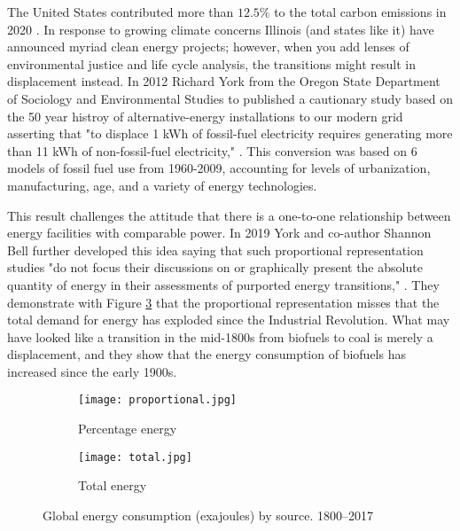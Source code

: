 The United States contributed more than $12.5\%$ to the total carbon emissions in 2020 \cite{european_commission_joint_research_centre_ghg_2021}. In response to growing climate concerns Illinois (and states like it) have announced myriad clean energy projects; however, when you add lenses of environmental justice and life cycle analysis, the transitions might result in displacement instead. In 2012 Richard York from the Oregon State Department of Sociology and Environmental Studies to published a cautionary study based on the 50 year histroy of alternative-energy installations to our modern grid asserting that "to displace 1 kWh of fossil-fuel electricity requires generating more than 11 kWh of non-fossil-fuel electricity," \cite{york_alternative_2012}. This conversion was based on 6 models of fossil fuel use from 1960-2009, accounting for levels of urbanization, manufacturing, age, and a variety of energy technologies.

This result challenges the attitude that there is a one-to-one relationship between energy facilities with comparable power. In 2019 York and co-author Shannon Bell further developed this idea saying that such proportional representation studies "do not focus their discussions on or graphically present the absolute quantity of energy in their assessments of purported energy transitions," \cite{york_energy_2019}. They demonstrate with Figure \ref{fig:both_plots} that the proportional representation misses that the total demand for energy has exploded since the Industrial Revolution. What may have looked like a transition in the mid-1800s from biofuels to coal is merely a displacement, and they show that the energy consumption of biofuels has increased since the early 1900s.

\begin{figure}[ht!]
  \begin{subfigure}{0.494\textwidth}
    \texttt{[image: proportional.jpg]}
    \caption{Percentage energy}
    \label{fig:first_plot}
  \end{subfigure}%
  \begin{subfigure}{0.515\textwidth}
    \texttt{[image: total.jpg]}
    \caption{Total energy}
    \label{fig:second_plot}
  \end{subfigure}
  \caption{Global energy consumption (exajoules) by source. 1800–2017 \cite{york_energy_2019}}
  \label{fig:both_plots}
\end{figure}

